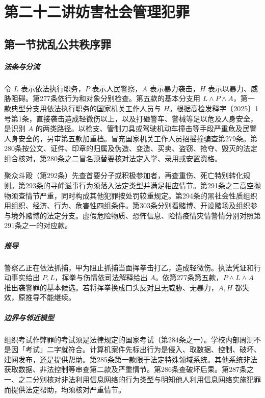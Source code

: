 \chapter{第二十二讲\quad 妨害社会管理犯罪}
\label{lecture:22}
\par

\section{第一节\quad 扰乱公共秩序罪}

\paragraph{法条与分流}
令 \(L\) 表示依法执行职务，\(P\) 表示人民警察，\(A\) 表示暴力袭击，\(H\) 表示以暴力、威胁阻碍。第277条依行为和对象分别检查。第五款的基本分支用 \(L\land P\land A\)，第一款典型分支用依法执行职务的国家机关工作人员与 \(H\)。根据高检发释字〔2025〕1号第1条，直接袭击造成轻微伤以上，以及打砸警车、警械等足以危及人身安全，是识别 \(A\) 的两类路径。以枪支、管制刀具或驾驶机动车撞击等手段严重危及民警人身安全的，另审第五款加重档。冒充国家机关工作人员招摇撞骗查第279条。第280条按公文、证件、印章的归属及伪造、变造、买卖、盗窃、抢夺、毁灭的法定组合核对，第280条之二冒名顶替要核对法定入学、录用或安置资格。

聚众斗殴（第292条）先查首要分子或积极参加者，再查重伤、死亡特别转化规则。第293条的寻衅滋事行为须落入法定类型并满足相应情节。第291条之二高空抛物须查情节严重，同时构成其他犯罪按处罚较重规定。第294条的黑社会性质组织用组织、经济、行为、危害性四组条件。第303条分别看赌博、开设赌场及组织参与境外赌博的法定分支。虚假危险物质、恐怖信息、险情疫情灾情警情分别对照第291条之一的对应款。

\paragraph{推导}
警察乙正在依法抓捕，甲为阻止抓捕当面挥拳击打乙，造成轻微伤。执法凭证和行动事实给出 \(P,L\)，挥拳与伤情依司法解释给出 \(A\)。依第277条第五款，\(P\land L\land A\) 推出袭警罪的基本候选。若将挥拳换成口头反对且无威胁、无暴力，\(A,H\) 都失效，原推导不能继续。

\paragraph{边界与邻近模型}
组织考试作弊罪的考试须是法律规定的国家考试（第284条之一）。学校内部周测不是因「考试」二字就符合。计算机案件先标出行为是侵入、取数据、控制、破坏、建网发布，还是提供帮助。第285条第一款限于法定特殊领域系统。其他系统非法获取数据、非法控制等审查第二款及严重情节。第286条查破坏后果。第287条之一、之二分别核对非法利用信息网络的行为类型与明知他人利用信息网络实施犯罪而提供法定帮助，均须核对严重情节。

